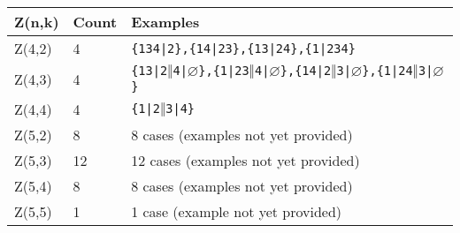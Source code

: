 \documentclass[a4paper]{amsart}
\begin{document}
\begin{center}
\begin{tabular}{|l|l|l|}
\hline
Z(n,k) & Count & Examples \\
\hline
Z(4,2) & 4 & \texttt{\{134|2\},\{14|23\},\{13|24\},\{1|234\}} \\
Z(4,3) & 4 & \texttt{\{13|2$\Vert$4|$\varnothing$\},\{1|23$\Vert$4|$\varnothing$\},\{14|2$\Vert$3|$\varnothing$\},\{1|24$\Vert$3|$\varnothing$\}}\\
Z(4,4) & 4 & \texttt{\{1|2$\Vert$3|4\}} \\
\hline
Z(5,2) & 8 & 8 cases (examples not yet provided)\\
Z(5,3) & 12 & 12 cases (examples not yet provided)\\
Z(5,4) & 8 & 8 cases (examples not yet provided)\\
Z(5,5) & 1 & 1 case (example not yet provided)\\
\hline
\end{tabular}
\end{center}
\end{document}
